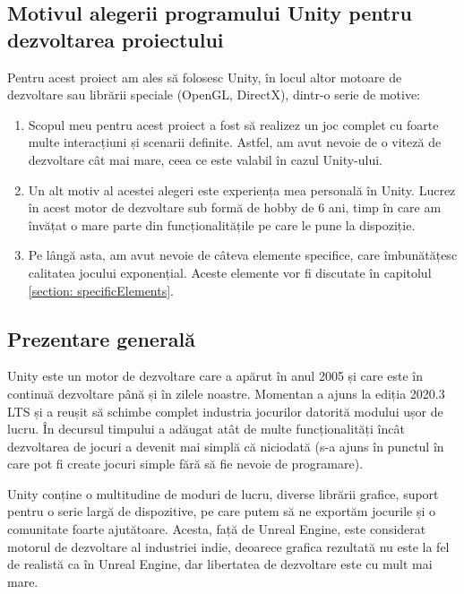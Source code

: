 \documentclass[12pt, a4paper]{article}
\begin{document}
	\subsection{Motivul alegerii programului Unity pentru dezvoltarea proiectului}
	
	Pentru acest proiect am ales să folosesc Unity, în locul altor motoare de dezvoltare sau librării speciale (OpenGL, DirectX), dintr-o serie de motive:
	
	\begin{enumerate}
		\item Scopul meu pentru acest proiect a fost să realizez un joc complet cu foarte multe interacțiuni și scenarii definite. Astfel, am avut nevoie de o viteză de dezvoltare cât mai mare, ceea ce este valabil în cazul Unity-ului.
		\item Un alt motiv al acestei alegeri este experiența mea personală în Unity. Lucrez în acest motor de dezvoltare sub formă de hobby de 6 ani, timp în care am învățat o mare parte din funcționalitățile pe care le pune la dispoziție.
		\item Pe lângă asta, am avut nevoie de câteva elemente specifice, care \newline îmbunătățesc calitatea jocului exponențial. Aceste elemente vor fi discutate în capitolul \hyperref[section: specificElements]{\ref{section: specificElements}}.
	\end{enumerate}
	
	
	
	
	
	\subsection{Prezentare generală}
	
	Unity este un motor de dezvoltare care a apărut în anul 2005 și care este în continuă dezvoltare până și în zilele noastre. Momentan a ajuns la ediția 2020.3 LTS și a reușit să schimbe complet industria jocurilor datorită modului ușor de lucru. În decursul timpului a adăugat atât de multe funcționalități încât dezvoltarea de jocuri a devenit mai simplă că niciodată (s-a ajuns în punctul în care pot fi create jocuri simple fără să fie nevoie de programare).
	\newline
	
	Unity conține o multitudine de moduri de lucru, diverse librării grafice, suport pentru o serie largă de dispozitive, pe care putem să ne exportăm jocurile și o comunitate foarte ajutătoare. Acesta, față de Unreal Engine, este considerat motorul de dezvoltare al industriei indie, deoarece grafica rezultată nu este la fel de realistă ca în Unreal Engine, dar libertatea de dezvoltare este cu mult mai mare.
	\newline
	
\end{document}

